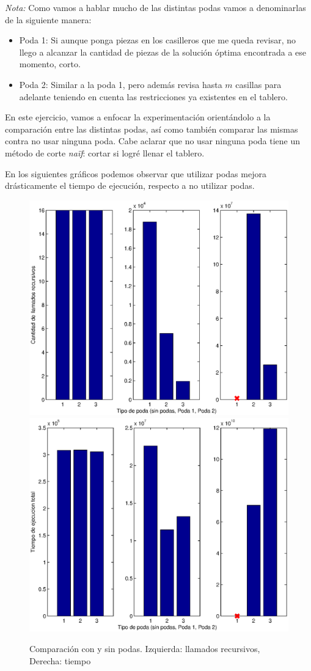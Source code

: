 \emph{Nota:} Como vamos a hablar mucho de las distintas podas vamos a denominarlas de la siguiente manera:
\begin{itemize}
\item Poda 1: Si aunque ponga piezas en los casilleros que me queda revisar, no llego a alcanzar la cantidad de piezas de la solución óptima encontrada a ese momento, corto.
\item Poda 2: Similar a la poda 1, pero además revisa hasta $m$ casillas para adelante teniendo en cuenta las restricciones ya existentes en el tablero.
\end{itemize}

En este ejercicio, vamos a enfocar la experimentación orientándolo a la comparación entre las distintas podas, así como también comparar las mismas contra no usar ninguna poda. Cabe aclarar que no usar ninguna poda tiene un método de corte \emph{naïf}: cortar si logré llenar el tablero.

En los siguientes gráficos podemos observar que utilizar podas mejora drásticamente el tiempo de ejecución, respecto a no utilizar podas.

\begin{center}
  \begin{figure}[H]
    \includegraphics[width=0.5\linewidth]{problema3/graficos/comparacion_podas_todas_instancias_llamados.eps}
    \includegraphics[width=0.5\linewidth]{problema3/graficos/comparacion_podas_todas_instancias_tiempo.eps}
    \caption{Comparación con y sin podas. Izquierda: llamados recursivos, Derecha: tiempo}
    \label{fig:problema3-sin-y-con-podas}
  \end{figure}
\end{center}

